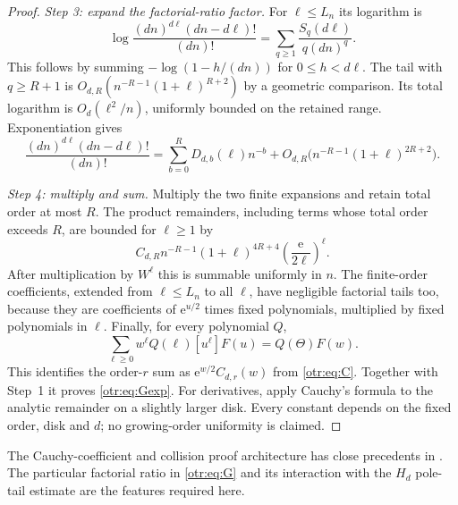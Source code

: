 \documentclass[11pt,a4paper]{article}
\theoremstyle{definition}\newtheorem{definition}[theorem]{Definition}
\theoremstyle{remark}\newtheorem{remark}[theorem]{Remark}
\newcommand{\e}{\mathrm e}
\begin{document}
\begin{proof}
\emph{Step 3: expand the factorial-ratio factor.}
For $\ell\le L_n$ its logarithm is
\begin{equation}\label{otr:eq:Dlog}
 \log\frac{(dn)^{d\ell}(dn-d\ell)!}{(dn)!}
 =\sum_{q\ge1}\frac{S_q(d\ell)}{q(dn)^q}.
\end{equation}
This follows by summing $-\log(1-h/(dn))$ for $0\le h<d\ell$. The tail with $q\ge R+1$ is
$O_{d,R}(n^{-R-1}(1+\ell)^{R+2})$ by a geometric comparison. Its total logarithm is $O_d(\ell^2/n)$, uniformly bounded on the retained range. Exponentiation gives
\begin{equation}\label{otr:eq:Derror}
 \frac{(dn)^{d\ell}(dn-d\ell)!}{(dn)!}
 =\sum_{b=0}^{R}D_{d,b}(\ell)n^{-b}
   +O_{d,R}\bigl(n^{-R-1}(1+\ell)^{2R+2}\bigr).
\end{equation}

\emph{Step 4: multiply and sum.}
Multiply the two finite expansions and retain total order at most $R$. The product remainders, including terms whose total order exceeds $R$, are bounded for $\ell\ge1$ by
\[
 C_{d,R}n^{-R-1}(1+\ell)^{4R+4}
                    \left(\frac{\e}{2\ell}\right)^\ell.
\]
After multiplication by $W^\ell$ this is summable uniformly in $n$. The finite-order coefficients, extended from $\ell\le L_n$ to all $\ell$, have negligible factorial tails too, because they are coefficients of $\e^{u/2}$ times fixed polynomials, multiplied by fixed polynomials in $\ell$. Finally, for every polynomial $Q$,
\[
 \sum_{\ell\ge0}w^\ell Q(\ell)[u^\ell]F(u)=Q(\Theta)F(w).
\]
This identifies the order-$r$ sum as $\e^{w/2}C_{d,r}(w)$ from \eqref{otr:eq:C}. Together with Step~1 it proves \eqref{otr:eq:Gexp}. For derivatives, apply Cauchy's formula to the analytic remainder on a slightly larger disk. Every constant depends on the fixed order, disk and $d$; no growing-order uniformity is claimed.
\end{proof}

The Cauchy-coefficient and collision proof architecture has close precedents in \cite{cps,pdc,mc}. The particular factorial ratio in \eqref{otr:eq:G} and its interaction with the $H_d$ pole-tail estimate are the features required here.
\end{document}
